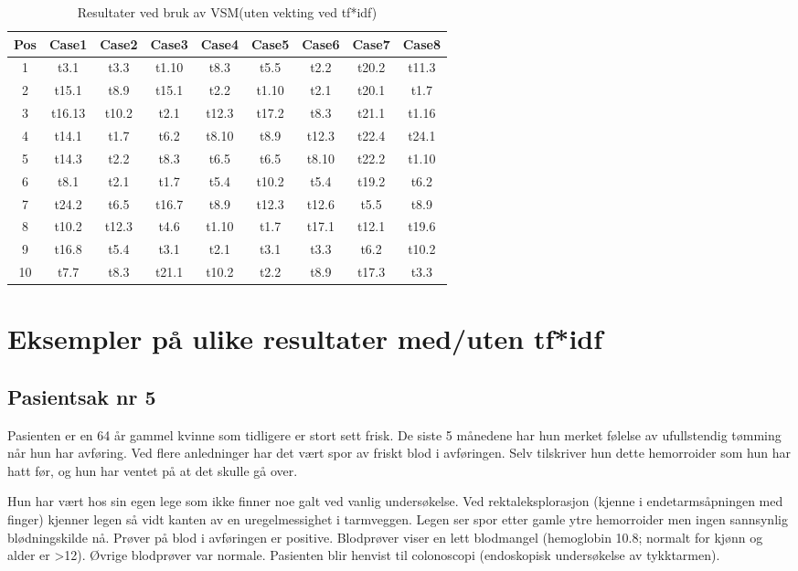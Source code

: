 \begin{table}[h!]
\begin{center}
\begin{tabular}{ | c c c c c c c c c | }
\hline
\textbf{Pos} & \textbf{Case1} & \textbf{Case2} & \textbf{Case3} & \textbf{Case4} & \textbf{Case5} & \textbf{Case6} & \textbf{Case7} & \textbf{Case8} \\ \hline
1 & t3.1 & t3.3 & t1.10 & t8.3 & t5.5 & t2.2 & t20.2 & t11.3 \\
2 & t15.1 & t8.9 & t15.1 & t2.2 & t1.10 & t2.1 & t20.1 & t1.7 \\
3 & t16.13 & t10.2 & t2.1 & t12.3 & t17.2 & t8.3 & t21.1 & t1.16 \\
4 & t14.1 & t1.7 & t6.2 & t8.10 & t8.9 & t12.3 & t22.4 & t24.1 \\
5 & t14.3 & t2.2 & t8.3 & t6.5 & t6.5 & t8.10 & t22.2 & t1.10 \\
6 & t8.1 & t2.1 & t1.7 & t5.4 & t10.2 & t5.4 & t19.2 & t6.2 \\
7 & t24.2 & t6.5 & t16.7 & t8.9 & t12.3 & t12.6 & t5.5 & t8.9 \\
8 & t10.2 & t12.3 & t4.6 & t1.10 & t1.7 & t17.1 & t12.1 & t19.6 \\
9 & t16.8 & t5.4 & t3.1 & t2.1 & t3.1 & t3.3 & t6.2 & t10.2 \\
10 & t7.7 & t8.3 & t21.1 & t10.2 & t2.2 & t8.9 & t17.3 & t3.3 \\
\hline
\end{tabular}
\end{center}
\caption{Resultater ved bruk av VSM(uten vekting ved tf*idf)}
\end{table}

\pagebreak
\section{Eksempler på ulike resultater med/uten tf*idf}
\subsection{Pasientsak nr 5}
Pasienten er en 64 år gammel kvinne som tidligere er stort sett frisk. De siste 5 månedene har hun merket følelse av ufullstendig tømming når hun har avføring. Ved flere anledninger har det vært spor av friskt blod i avføringen. Selv tilskriver hun dette hemorroider som hun har hatt før, og hun har ventet på at det skulle gå over.

Hun har vært hos sin egen lege som ikke finner noe galt ved vanlig undersøkelse. Ved rektaleksplorasjon (kjenne i endetarmsåpningen med finger) kjenner legen så vidt kanten av en uregelmessighet i tarmveggen. Legen ser spor etter gamle ytre hemorroider men ingen sannsynlig blødningskilde nå. Prøver på blod i avføringen er positive. Blodprøver viser en lett blodmangel (hemoglobin 10.8; normalt for kjønn og alder er >12). Øvrige blodprøver var normale. Pasienten blir henvist til colonoscopi (endoskopisk undersøkelse av tykktarmen).


